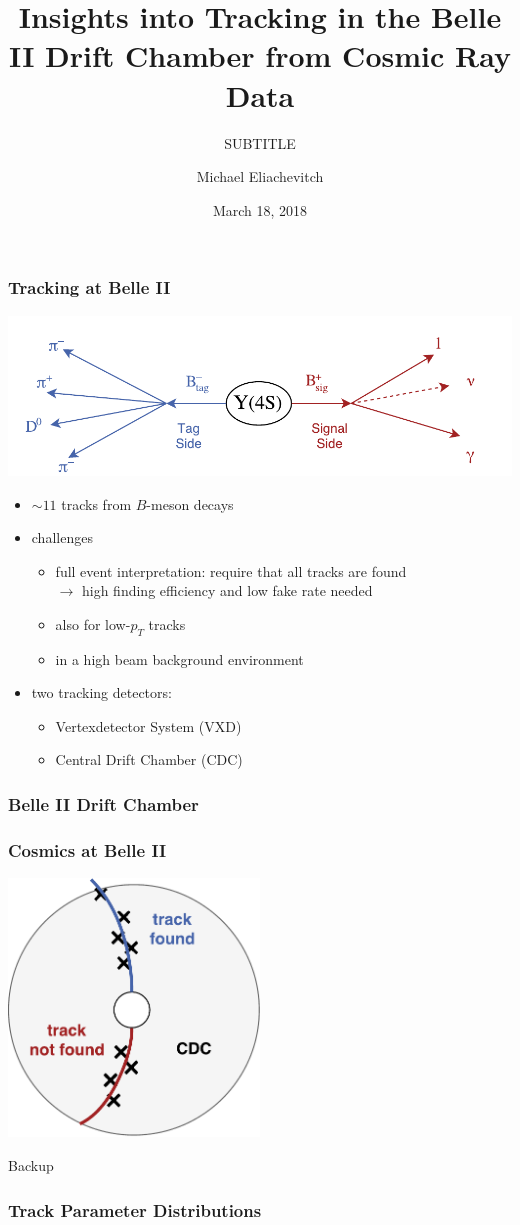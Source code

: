 \documentclass[18pt]{beamer}
\title{Insights into Tracking in the Belle II Drift Chamber from Cosmic Ray Data}
\subtitle{SUBTITLE}
\author{Michael Eliachevitch}
\date{March 18, 2018}
\institute{ETP - KIT}
\begin{document}
  
  \begin{frame}
  \titlepage
\end{frame}

\begin{frame}
  \frametitle{Tracking at Belle II}
  \includegraphics[width=.5\textwidth]{figures/Y4S_tagsig.pdf}
  \begin{itemize}
  \item $\sim 11$ tracks from $B$-meson decays
  \item challenges
    \begin{itemize}
    \item full event interpretation: require that all tracks are found\\
      $\rightarrow$ high finding efficiency and low fake rate needed
    \item also for low-$p_T$ tracks
    \item in a high beam background environment
    \end{itemize}
  \item two tracking detectors:
    \begin{itemize}
    \item Vertexdetector System (VXD)
    \item Central Drift Chamber (CDC)
    \end{itemize}
  \end{itemize}
\end{frame}

    
\begin{frame}
  \frametitle{Belle II Drift Chamber}
  
\end{frame}

\begin{frame}
  \frametitle{Cosmics at Belle II}
  \includegraphics[width=0.5\textwidth]{figures/cdc_finding_fail_diagram.pdf}
\end{frame}




\backupbegin

\begin{frame}
  \centering \huge
  Backup
\end{frame}

\begin{frame}
  \frametitle{Track Parameter Distributions}
  
\end{frame}
\end{document}
